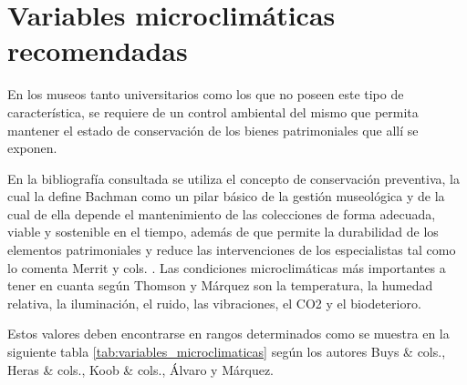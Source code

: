 
    \section{Variables microclimáticas recomendadas}

    En los museos tanto universitarios como los que no poseen este tipo de característica, se requiere de un control ambiental del mismo que permita mantener el estado de conservación de los bienes patrimoniales que allí se exponen.

    En la bibliografía consultada se utiliza el concepto de conservación preventiva, la cual la define Bachman \cite{bachmann1992conservation} como un pilar básico de la gestión museológica y de la cual de ella depende el mantenimiento de las colecciones de forma adecuada, viable y sostenible en el tiempo, además de que permite la durabilidad de los elementos patrimoniales y reduce las intervenciones de los especialistas tal como lo comenta Merrit y cols. \cite{merrittPreventiveConservationHistoric2010}. Las condiciones microclimáticas más importantes a tener en cuanta según Thomson \cite{thomsonMuseumEnvironment2018} y Márquez \cite{marquezAgentesDeterioroMedioambientales2016} son la temperatura, la humedad relativa, la iluminación, el ruido, las vibraciones, el CO2 y el biodeterioro.

    Estos valores deben encontrarse en rangos determinados como se muestra en la siguiente tabla \ref{tab:variables_microclimaticas} según los autores Buys \& cols., Heras \& cols., Koob \& cols., Álvaro y Márquez.
    
